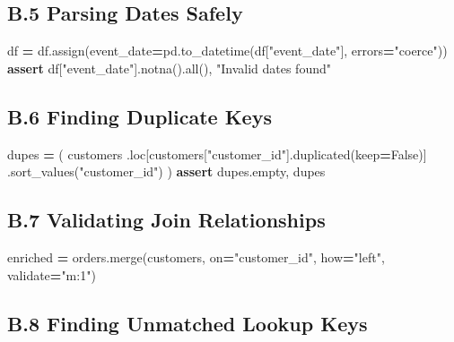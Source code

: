 \documentclass[
  12pt,
]{article}
\newenvironment{Shaded}{\begin{snugshade}}{\end{snugshade}}
\newcommand{\BuiltInTok}[1]{#1}
\newcommand{\ControlFlowTok}[1]{\textcolor[rgb]{0.13,0.29,0.53}{\textbf{#1}}}
\newcommand{\NormalTok}[1]{#1}
\newcommand{\OperatorTok}[1]{\textcolor[rgb]{0.81,0.36,0.00}{\textbf{#1}}}
\newcommand{\StringTok}[1]{\textcolor[rgb]{0.31,0.60,0.02}{#1}}
\newcommand{\VariableTok}[1]{\textcolor[rgb]{0.00,0.00,0.00}{#1}}
\begin{document}
\subsection{B.5 Parsing Dates Safely}\label{b.5-parsing-dates-safely}

\begin{Shaded}
\begin{Highlighting}[]
\NormalTok{df }\OperatorTok{=}\NormalTok{ df.assign(event\_date}\OperatorTok{=}\NormalTok{pd.to\_datetime(df[}\StringTok{"event\_date"}\NormalTok{], errors}\OperatorTok{=}\StringTok{"coerce"}\NormalTok{))}
\ControlFlowTok{assert}\NormalTok{ df[}\StringTok{"event\_date"}\NormalTok{].notna().}\BuiltInTok{all}\NormalTok{(), }\StringTok{"Invalid dates found"}
\end{Highlighting}
\end{Shaded}

\subsection{B.6 Finding Duplicate
Keys}\label{b.6-finding-duplicate-keys}

\begin{Shaded}
\begin{Highlighting}[]
\NormalTok{dupes }\OperatorTok{=}\NormalTok{ (}
\NormalTok{    customers}
\NormalTok{    .loc[customers[}\StringTok{"customer\_id"}\NormalTok{].duplicated(keep}\OperatorTok{=}\VariableTok{False}\NormalTok{)]}
\NormalTok{    .sort\_values(}\StringTok{"customer\_id"}\NormalTok{)}
\NormalTok{)}
\ControlFlowTok{assert}\NormalTok{ dupes.empty, dupes}
\end{Highlighting}
\end{Shaded}

\subsection{B.7 Validating Join
Relationships}\label{b.7-validating-join-relationships}

\begin{Shaded}
\begin{Highlighting}[]
\NormalTok{enriched }\OperatorTok{=}\NormalTok{ orders.merge(customers, on}\OperatorTok{=}\StringTok{"customer\_id"}\NormalTok{, how}\OperatorTok{=}\StringTok{"left"}\NormalTok{, validate}\OperatorTok{=}\StringTok{"m:1"}\NormalTok{)}
\end{Highlighting}
\end{Shaded}

\subsection{B.8 Finding Unmatched Lookup
Keys}\label{b.8-finding-unmatched-lookup-keys}
\end{document}
